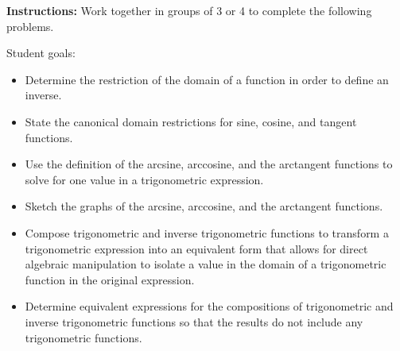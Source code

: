 


\noindent \textbf{Instructions:}  Work together in groups of  3 or 4
to complete the following problems.

Student goals:
\begin{itemize}
\item Determine the restriction of the domain of a function in order
  to define an inverse.
\item State the canonical domain restrictions for sine, cosine, and
  tangent functions.
\item Use the definition of the arcsine, arccosine, and the arctangent
  functions to solve for one value in a trigonometric expression.
\item Sketch the graphs of the arcsine, arccosine, and the arctangent
  functions.
\item Compose trigonometric and inverse trigonometric functions to
  transform a trigonometric expression into an equivalent form that
  allows for direct algebraic manipulation to isolate a value in the
  domain of a trigonometric function in the original expression.
\item Determine equivalent expressions for the compositions of
  trigonometric and inverse trigonometric functions so that the
  results do not include any trigonometric functions.
\end{itemize}


